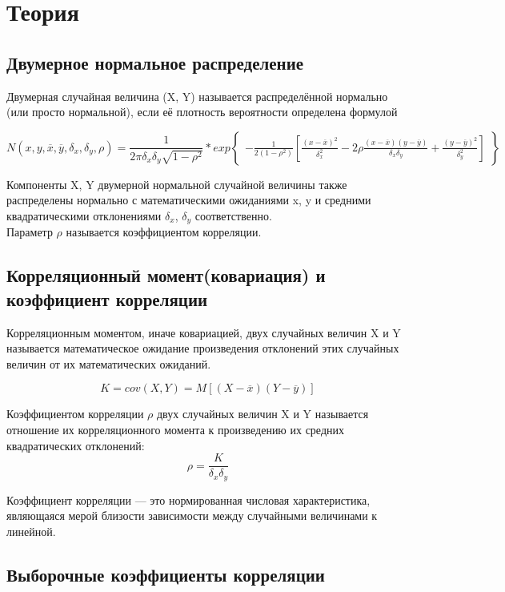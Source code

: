 \documentclass[a4]{article}
\begin{document}
	\section{Теория}
		\subsection{Двумерное нормальное распределение}
			Двумерная случайная величина (X, Y) называется распределённой нормально (или просто нормальной), если её плотность вероятности определена
			формулой
			
			$$N(x, y, \overline{x}, \overline{y}, \delta_x, \delta_y, \rho) = \frac{1}{2\pi\delta_x\delta_y\sqrt{1 - \rho^2}} * exp\left\{
			\begin{array}{ccc}
			-\frac{1}{2(1 - \rho^2)} [\frac{(x - \overline{x})^2}{\delta^2_x} - 2\rho\frac{(x - \overline{x})(y - \overline{y})}{\delta_x \delta_y} + \frac{(y - \overline{y})^2}{\delta^2_y}]
			\end{array}
			\right\}$$
			
			Компоненты X, Y двумерной нормальной случайной величины также распределены нормально с математическими ожиданиями x, y и средними квадратическими отклонениями $\delta_x$, $\delta_y$ соответственно. \\
			Параметр $\rho$ называется коэффициентом корреляции.
		
		\subsection{Корреляционный момент(ковариация) и коэффициент корреляции}
			Корреляционным моментом, иначе ковариацией, двух случайных величин X и Y называется математическое ожидание произведения отклонений этих случайных величин от их математических ожиданий.
			
			$$K = cov(X, Y) = M[(X - \overline{x})(Y - \overline{y})]$$
			
			Коэффициентом корреляции $\rho$ двух случайных величин X и Y называется отношение их корреляционного момента к произведению их средних квадратических отклонений:
			$$\rho = \frac{K}{\delta_x\delta_y}$$

			
			Коэффициент корреляции — это нормированная числовая характеристика, являющаяся мерой близости зависимости между случайными величинами
			к линейной.
			
			\subsection{Выборочные коэффициенты корреляции}
\end{document}
